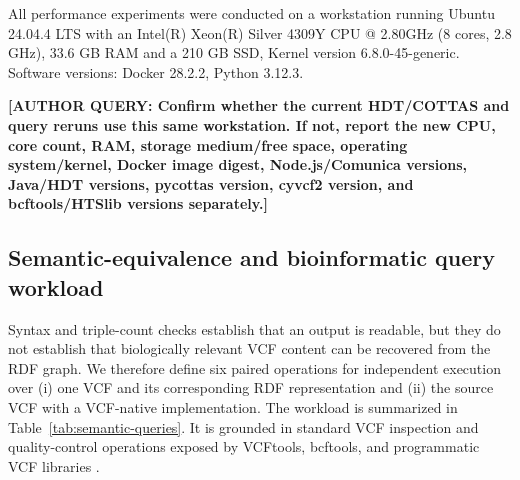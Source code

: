 \documentclass[pdflatex,sn-mathphys-num]{sn-jnl}%
\newenvironment{revision}{\begingroup\color{revisionblue}}{\endgroup}%
\newcommand{\authorquery}[1]{%
  \par\smallskip\noindent
  {\color{queryorange}\textbf{[AUTHOR QUERY: #1]}}%
  \par\smallskip
}%
\theoremstyle{thmstyleone}%
\theoremstyle{thmstyletwo}%
\theoremstyle{thmstylethree}%
\begin{document}
All performance experiments were conducted on a workstation running Ubuntu 24.04.4 LTS with an Intel(R) Xeon(R) Silver 4309Y CPU @ 2.80GHz (8 cores, 2.8 GHz), 33.6 GB RAM and a 210 GB SSD, Kernel version 6.8.0-45-generic. Software versions: Docker 28.2.2, Python 3.12.3.
\authorquery{Confirm whether the current HDT/COTTAS and query reruns use this same workstation. If not, report the new CPU, core count, RAM, storage medium/free space, operating system/kernel, Docker image digest, Node.js/Comunica versions, Java/HDT versions, pycottas version, cyvcf2 version, and bcftools/HTSlib versions separately.}

\begin{revision}
\subsection{Semantic-equivalence and bioinformatic query workload}\label{subsec2.4}
Syntax and triple-count checks establish that an output is readable, but they do not establish that biologically relevant VCF content can be recovered from the RDF graph. We therefore define six paired operations for independent execution over (i) one VCF and its corresponding RDF representation and (ii) the source VCF with a VCF-native implementation. The workload is summarized in Table~\ref{tab:semantic-queries}. It is grounded in standard VCF inspection and quality-control operations exposed by VCFtools, bcftools, and programmatic VCF libraries \cite{vcf_intro,BCFtools,cyvcf2_2017}.


\end{revision}
\end{document}
